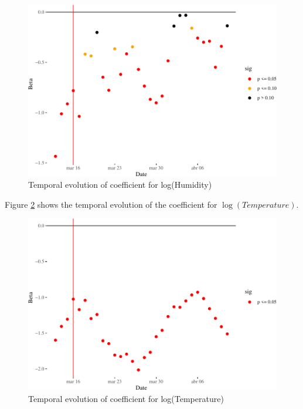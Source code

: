 \documentclass[]{elsarticle} %
\makeatletter
\def\maxwidth{\ifdim\Gin@nat@width>\linewidth\linewidth
\else\Gin@nat@width\fi}
\let\Oldincludegraphics\includegraphics
\renewcommand{\includegraphics}[1]{\Oldincludegraphics[width=\maxwidth]{#1}}
\makeatother
\begin{document}
\begin{figure}
\centering
\includegraphics{Environmental-Correlates-of-COVID19-Spain_files/figure-latex/beta-humidity-time-1.pdf}
\caption{\label{fig:beta-humidity-time}Temporal evolution of coefficient
for log(Humidity)}
\end{figure}

Figure \ref{fig:beta-temperature-time} shows the temporal evolution of
the coefficient for \(\log(Temperature)\).

\begin{figure}
\centering
\includegraphics{Environmental-Correlates-of-COVID19-Spain_files/figure-latex/beta-temperature-time-1.pdf}
\caption{\label{fig:beta-temperature-time}Temporal evolution of
coefficient for log(Temperature)}
\end{figure}
\end{document}
